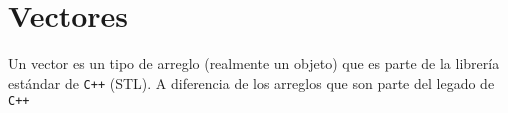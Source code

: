\chapter{Vectores}

Un vector es un tipo de arreglo (realmente un objeto) que es parte de la librería estándar de \texttt{C++} (STL). A diferencia de los arreglos que son parte del legado de \texttt{C++}